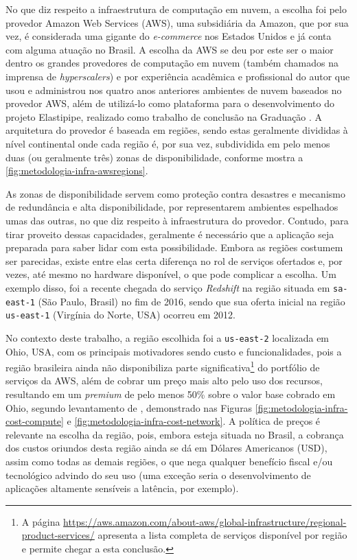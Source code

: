 \documentclass[english,brazilian]{UNISINOSmonografia} %
\begin{document}
No que diz respeito a infraestrutura de computação em nuvem, a escolha foi pelo provedor Amazon Web Services (AWS), uma subsidiária da Amazon, que por sua vez, é considerada uma gigante do \textit{e-commerce} nos Estados Unidos e já conta com alguma atuação no Brasil.
%
A escolha da AWS se deu por este ser o maior dentro os grandes provedores de computação em nuvem (também chamados na imprensa de \textit{hyperscalers}) e por experiência acadêmica e profissional do autor que usou e administrou nos quatro anos anteriores ambientes de nuvem baseados no provedor AWS, além de utilizá-lo como plataforma para o desenvolvimento do projeto Elastipipe, realizado como trabalho de conclusão na Graduação \cite{Aubin2015,Aubin2016,Aubin2017}.
%
A arquitetura do provedor é baseada em regiões, sendo estas geralmente divididas à nível continental onde cada região é, por sua vez, subdividida em pelo menos duas (ou geralmente três) zonas de disponibilidade, conforme mostra a \autoref{fig:metodologia-infra-awsregions}.


As zonas de disponibilidade servem como proteção contra desastres e mecanismo de redundância e alta disponibilidade, por representarem ambientes espelhados umas das outras, no que diz respeito à infraestrutura do provedor.
%
Contudo, para tirar proveito dessas capacidades, geralmente é necessário que a aplicação seja preparada para saber lidar com esta possibilidade.
%
Embora as regiões costumem ser parecidas, existe entre elas certa diferença no rol de serviços ofertados e, por vezes, até mesmo no hardware disponível, o que pode complicar a escolha.
%
Um exemplo disso, foi a recente chegada do serviço \textit{Redshift} na região situada em \texttt{sa-east-1} (São Paulo, Brasil) no fim de 2016, sendo que sua oferta inicial na região \texttt{us-east-1} (Virgínia do Norte, USA) ocorreu em 2012.


No contexto deste trabalho, a região escolhida foi a \texttt{us-east-2} localizada em Ohio, USA, com os principais motivadores sendo custo e funcionalidades, pois a região brasileira ainda não disponibiliza parte significativa\footnote{
	A página \url{https://aws.amazon.com/about-aws/global-infrastructure/regional-product-services/} apresenta a lista completa de serviços disponível por região e permite chegar a esta conclusão.
}
do portfólio de serviços da AWS, além de cobrar um preço mais alto pelo uso dos recursos, resultando em um \textit{premium} de pelo menos 50\% sobre o valor base cobrado em Ohio, segundo levantamento de , demonstrado nas Figuras \ref{fig:metodologia-infra-cost-compute} e \ref{fig:metodologia-infra-cost-network}.
%
A política de preços é relevante na escolha da região, pois, embora esteja situada no Brasil, a cobrança dos custos oriundos desta região ainda se dá em Dólares Americanos (USD), assim como todas as demais regiões, o que nega qualquer benefício fiscal e/ou tecnológico advindo do seu uso (uma exceção seria o desenvolvimento de aplicações altamente sensíveis a latência, por exemplo).
\end{document}
